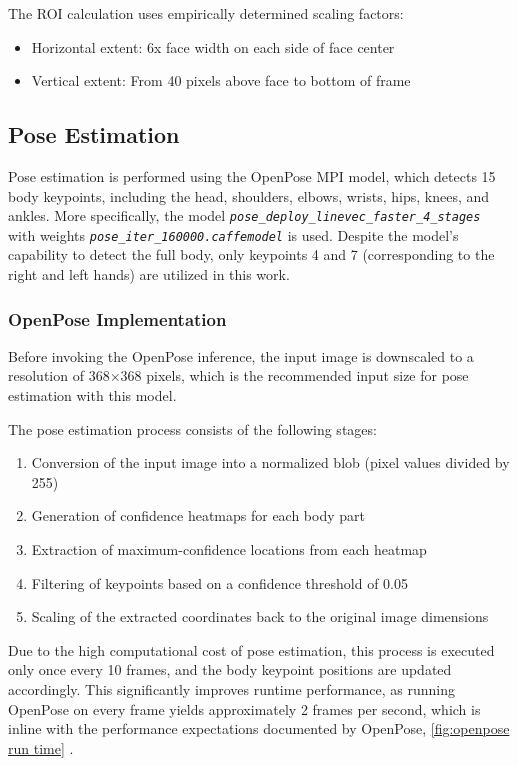 \documentclass[12pt]{article}
\begin{document}
The ROI calculation uses empirically determined scaling factors:
\begin{itemize}
    \item Horizontal extent: 6x face width on each side of face center
    \item Vertical extent: From 40 pixels above face to bottom of frame
\end{itemize}

\subsection{Pose Estimation} \label{subsec:Pose Estimation}

Pose estimation is performed using the OpenPose MPI model, which detects 15
body keypoints, including the head, shoulders, elbows, wrists, hips, knees, and
ankles. More specifically, the model
\textit{\texttt{pose\_deploy\_linevec\_faster\_4\_stages}} with weights
\textit{\texttt{pose\_iter\_160000.caffemodel}} is used. Despite the model's
capability to detect the full body, only keypoints 4 and 7 (corresponding to
the right and left hands) are utilized in this work.

\subsubsection{OpenPose Implementation}
Before invoking the OpenPose inference, the input image is downscaled to a
resolution of 368$\times$368 pixels, which is the recommended input size for
pose estimation with this model.

The pose estimation process consists of the following stages:
\begin{enumerate}
    \item Conversion of the input image into a normalized blob (pixel values divided by
          255)
    \item Generation of confidence heatmaps for each body part
    \item Extraction of maximum-confidence locations from each heatmap
    \item Filtering of keypoints based on a confidence threshold of 0.05
    \item Scaling of the extracted coordinates back to the original image dimensions
\end{enumerate}

Due to the high computational cost of pose estimation, this process is executed
only once every 10 frames, and the body keypoint positions are updated
accordingly. This significantly improves runtime performance, as running
OpenPose on every frame yields approximately 2 frames per second, which is
inline with the performance expectations documented by OpenPose,
\cref{fig:openpose run time} \cite{cao2019openposerealtimemultiperson2d}.
\end{document}
